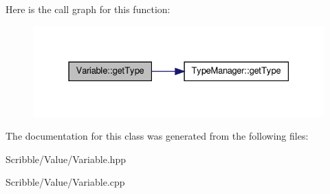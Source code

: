 Here is the call graph for this function\-:
\nopagebreak
\begin{figure}[H]
\begin{center}
\leavevmode
\includegraphics[width=328pt]{class_variable_aae941609938eb8fc4cdfb3273be3a293_cgraph}
\end{center}
\end{figure}




The documentation for this class was generated from the following files\-:\begin{DoxyCompactItemize}
\item 
Scribble/\-Value/Variable.\-hpp\item 
Scribble/\-Value/Variable.\-cpp\end{DoxyCompactItemize}
